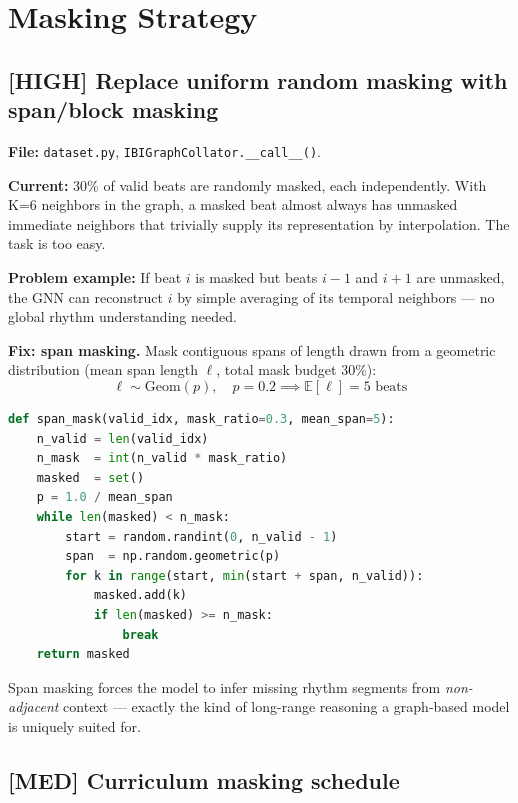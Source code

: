 \documentclass[11pt,a4paper]{article}
\newcommand{\high}[1]{\textcolor{impacthigh}{\textbf{[HIGH]} #1}}
\newcommand{\med}[1]{\textcolor{impactmed}{\textbf{[MED]} #1}}
\newcommand{\file}[1]{\texttt{#1}}
\begin{document}
\section{Masking Strategy}

\subsection{\high{Replace uniform random masking with span/block masking}}

\textbf{File:} \file{dataset.py}, \texttt{IBIGraphCollator.\_\_call\_\_()}.

\textbf{Current:} 30\% of valid beats are randomly masked, each independently.
With K=6 neighbors in the graph, a masked beat almost always has unmasked
immediate neighbors that trivially supply its representation by interpolation.
The task is too easy.

\textbf{Problem example:} If beat $i$ is masked but beats $i{-}1$ and $i{+}1$
are unmasked, the GNN can reconstruct $i$ by simple averaging of its temporal
neighbors --- no global rhythm understanding needed.

\textbf{Fix: span masking.}
Mask contiguous spans of length drawn from a geometric distribution
(mean span length $\ell$, total mask budget 30\%):
\[
    \ell \sim \text{Geom}(p), \quad p = 0.2 \implies \mathbb{E}[\ell] = 5 \text{ beats}
\]

\begin{lstlisting}[language=Python]
def span_mask(valid_idx, mask_ratio=0.3, mean_span=5):
    n_valid = len(valid_idx)
    n_mask  = int(n_valid * mask_ratio)
    masked  = set()
    p = 1.0 / mean_span
    while len(masked) < n_mask:
        start = random.randint(0, n_valid - 1)
        span  = np.random.geometric(p)
        for k in range(start, min(start + span, n_valid)):
            masked.add(k)
            if len(masked) >= n_mask:
                break
    return masked
\end{lstlisting}

Span masking forces the model to infer missing rhythm segments from
\emph{non-adjacent} context --- exactly the kind of long-range reasoning
a graph-based model is uniquely suited for.

\subsection{\med{Curriculum masking schedule}}
\end{document}
